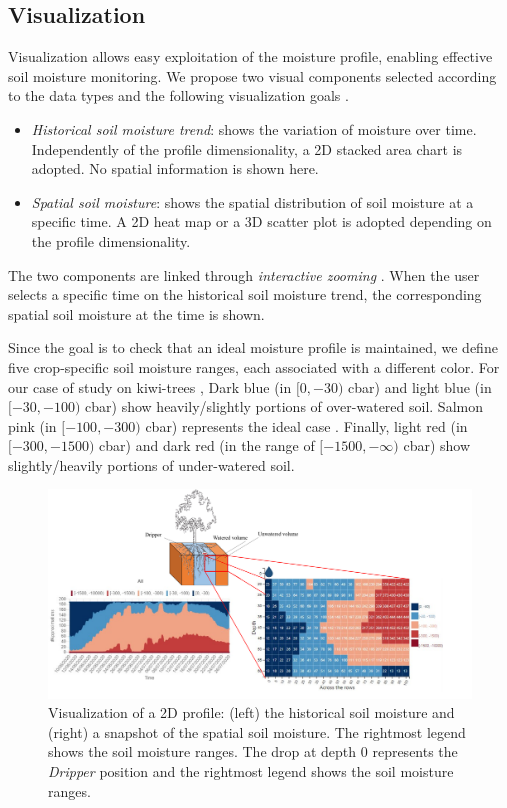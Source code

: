 \subsection{Visualization}
\label{pluto-sec:visualization}
Visualization allows easy exploitation of the moisture profile, enabling effective soil moisture monitoring.
We propose two visual components selected according to the data types and the following visualization goals \cite{golfarelli2020model}.
\begin{itemize}
    \item \emph{Historical soil moisture trend}: shows the variation of moisture over time.
    Independently of the profile dimensionality, a 2D stacked area chart is adopted.
    No spatial information is shown here.
    \item \emph{Spatial soil moisture}: shows the spatial distribution of soil moisture at a specific time. A 2D heat map or a 3D scatter plot is adopted depending on the profile dimensionality.
\end{itemize}
The two components are linked through \emph{interactive zooming} \cite{keim2002information}. When the user selects a specific time on the historical soil moisture trend, the corresponding spatial soil moisture at the time is shown.

Since the goal is to check that an ideal moisture profile is maintained, we define five crop-specific soil moisture ranges, each associated with a different color.
For our case of study on kiwi-trees \cite{ABDS}, Dark blue (in $[0, -30)$ cbar) and light blue (in $[-30, -100)$ cbar) show heavily/slightly portions of over-watered soil. Salmon pink (in $[-100, -300)$ cbar) represents the ideal case \cite{miller1998effects}.
Finally, light red (in $[-300, -1500)$ cbar) and dark red (in the range of $[-1500, -\infty)$ cbar) show slightly/heavily portions of under-watered soil.

\begin{figure}[t]
\centering
\includegraphics[scale=.12]{chapters/physics-aware/pluto/img/2d-visualization.pdf}
\caption{Visualization of a 2D profile: (left) the historical soil moisture and (right) a snapshot of the spatial soil moisture. The rightmost legend shows the soil moisture ranges. The drop at depth $0$ represents the \textit{Dripper} position and the rightmost legend shows the soil moisture ranges.}
\label{pluto-fig:2D-visualization}
\end{figure}

